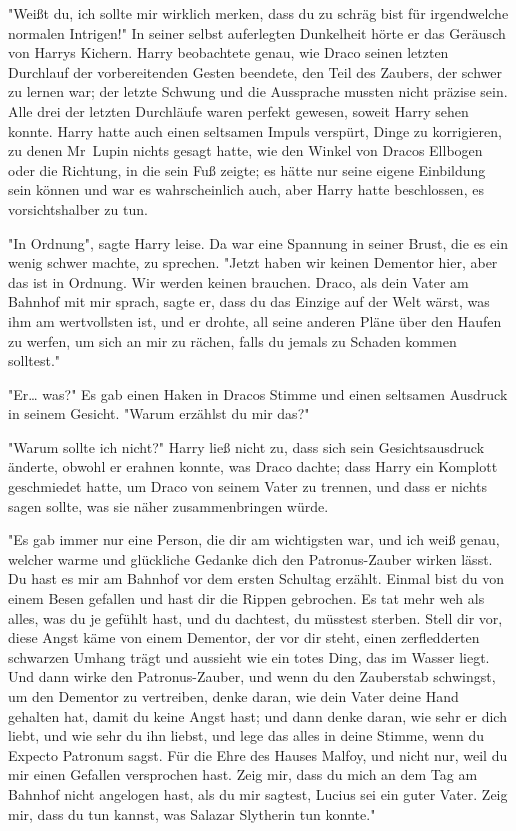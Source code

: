 {"Weißt du, ich sollte mir wirklich merken, dass du zu schräg bist für irgendwelche normalen Intrigen!" In seiner selbst auferlegten Dunkelheit hörte er das Geräusch von Harrys Kichern. Harry beobachtete genau, wie Draco seinen letzten Durchlauf der vorbereitenden Gesten beendete, den Teil des Zaubers, der schwer zu lernen war; der letzte Schwung und die Aussprache mussten nicht präzise sein. Alle drei der letzten Durchläufe waren perfekt gewesen, soweit Harry sehen konnte. Harry hatte auch einen seltsamen Impuls verspürt, Dinge zu korrigieren, zu denen Mr~Lupin nichts gesagt hatte, wie den Winkel von Dracos Ellbogen oder die Richtung, in die sein Fuß zeigte; es hätte nur seine eigene Einbildung sein können und war es wahrscheinlich auch, aber Harry hatte beschlossen, es vorsichtshalber zu tun.

"In Ordnung", sagte Harry leise. Da war eine Spannung in seiner Brust, die es ein wenig schwer machte, zu sprechen. "Jetzt haben wir keinen Dementor hier, aber das ist in Ordnung. Wir werden keinen brauchen. Draco, als dein Vater am Bahnhof mit mir sprach, sagte er, dass du das Einzige auf der Welt wärst, was ihm am wertvollsten ist, und er drohte, all seine anderen Pläne über den Haufen zu werfen, um sich an mir zu rächen, falls du jemals zu Schaden kommen solltest."

"Er… was?" Es gab einen Haken in Dracos Stimme und einen seltsamen Ausdruck in seinem Gesicht. "Warum erzählst du mir das?"

"Warum sollte ich nicht?" Harry ließ nicht zu, dass sich sein Gesichtsausdruck änderte, obwohl er erahnen konnte, was Draco dachte; dass Harry ein Komplott geschmiedet hatte, um Draco von seinem Vater zu trennen, und dass er nichts sagen sollte, was sie näher zusammenbringen würde.

"Es gab immer nur eine Person, die dir am wichtigsten war, und ich weiß genau, welcher warme und glückliche Gedanke dich den Patronus-Zauber wirken lässt. Du hast es mir am Bahnhof vor dem ersten Schultag erzählt. Einmal bist du von einem Besen gefallen und hast dir die Rippen gebrochen. Es tat mehr weh als alles, was du je gefühlt hast, und du dachtest, du müsstest sterben. Stell dir vor, diese Angst käme von einem Dementor, der vor dir steht, einen zerfledderten schwarzen Umhang trägt und aussieht wie ein totes Ding, das im Wasser liegt. Und dann wirke den Patronus-Zauber, und wenn du den Zauberstab schwingst, um den Dementor zu vertreiben, denke daran, wie dein Vater deine Hand gehalten hat, damit du keine Angst hast; und dann denke daran, wie sehr er dich liebt, und wie sehr du ihn liebst, und lege das alles in deine Stimme, wenn du Expecto Patronum sagst. Für die Ehre des Hauses Malfoy, und nicht nur, weil du mir einen Gefallen versprochen hast. Zeig mir, dass du mich an dem Tag am Bahnhof nicht angelogen hast, als du mir sagtest, Lucius sei ein guter Vater. Zeig mir, dass du tun kannst, was Salazar Slytherin tun konnte."

}
